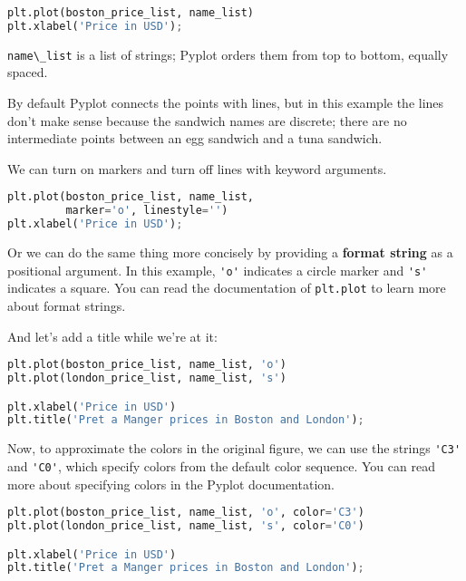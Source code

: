 \begin{lstlisting}[language=Python,style=source]
plt.plot(boston_price_list, name_list)
plt.xlabel('Price in USD');
\end{lstlisting}

\passthrough{\lstinline!name\_list!} is a list of strings; Pyplot orders
them from top to bottom, equally spaced.

By default Pyplot connects the points with lines, but in this example
the lines don't make sense because the sandwich names are discrete;
there are no intermediate points between an egg sandwich and a tuna
sandwich.

We can turn on markers and turn off lines with keyword arguments.

\begin{lstlisting}[language=Python,style=source]
plt.plot(boston_price_list, name_list, 
         marker='o', linestyle='')
plt.xlabel('Price in USD');
\end{lstlisting}

Or we can do the same thing more concisely by providing a \textbf{format
string} as a positional argument. In this example,
\passthrough{\lstinline!'o'!} indicates a circle marker and
\passthrough{\lstinline!'s'!} indicates a square. You can read the
documentation of \passthrough{\lstinline!plt.plot!} to learn more about
format strings.

And let's add a title while we're at it:

\begin{lstlisting}[language=Python,style=source]
plt.plot(boston_price_list, name_list, 'o')
plt.plot(london_price_list, name_list, 's')

plt.xlabel('Price in USD')
plt.title('Pret a Manger prices in Boston and London');
\end{lstlisting}

Now, to approximate the colors in the original figure, we can use the
strings \passthrough{\lstinline!'C3'!} and
\passthrough{\lstinline!'C0'!}, which specify colors from the default
color sequence. You can read more about specifying colors in the Pyplot
documentation.

\begin{lstlisting}[language=Python,style=source]
plt.plot(boston_price_list, name_list, 'o', color='C3')
plt.plot(london_price_list, name_list, 's', color='C0')

plt.xlabel('Price in USD')
plt.title('Pret a Manger prices in Boston and London');
\end{lstlisting}

